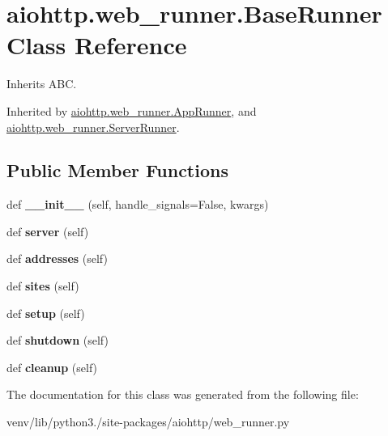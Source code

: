 \hypertarget{classaiohttp_1_1web__runner_1_1_base_runner}{}\section{aiohttp.\+web\+\_\+runner.\+Base\+Runner Class Reference}
\label{classaiohttp_1_1web__runner_1_1_base_runner}


Inherits A\+BC.



Inherited by \hyperlink{classaiohttp_1_1web__runner_1_1_app_runner}{aiohttp.\+web\+\_\+runner.\+App\+Runner}, and \hyperlink{classaiohttp_1_1web__runner_1_1_server_runner}{aiohttp.\+web\+\_\+runner.\+Server\+Runner}.

\subsection*{Public Member Functions}
\begin{DoxyCompactItemize}
\item 
\mbox{\label{classaiohttp_1_1web__runner_1_1_base_runner_aa5b3f6ea7b3ce801a08708dbbec0cbc3}} 
def {\bfseries \+\_\+\+\_\+init\+\_\+\+\_\+} (self, handle\+\_\+signals=False, kwargs)
\item 
\mbox{\label{classaiohttp_1_1web__runner_1_1_base_runner_a5fb1ea3ce393e193090c557a618e39f0}} 
def {\bfseries server} (self)
\item 
\mbox{\label{classaiohttp_1_1web__runner_1_1_base_runner_a84073b70d9a70348f30d4d8b452424b2}} 
def {\bfseries addresses} (self)
\item 
\mbox{\label{classaiohttp_1_1web__runner_1_1_base_runner_afc9661daac522041fe117299821f53f2}} 
def {\bfseries sites} (self)
\item 
\mbox{\label{classaiohttp_1_1web__runner_1_1_base_runner_a9911325c2367247e3ed7e1c61465f71f}} 
def {\bfseries setup} (self)
\item 
\mbox{\label{classaiohttp_1_1web__runner_1_1_base_runner_ac20fad4067884f07a32074fad76a70e6}} 
def {\bfseries shutdown} (self)
\item 
\mbox{\label{classaiohttp_1_1web__runner_1_1_base_runner_a7bb85d340b380c9e2b5196595a690a02}} 
def {\bfseries cleanup} (self)
\end{DoxyCompactItemize}


The documentation for this class was generated from the following file\+:\begin{DoxyCompactItemize}
\item 
venv/lib/python3./site-\/packages/aiohttp/web\+\_\+runner.\+py\end{DoxyCompactItemize}
